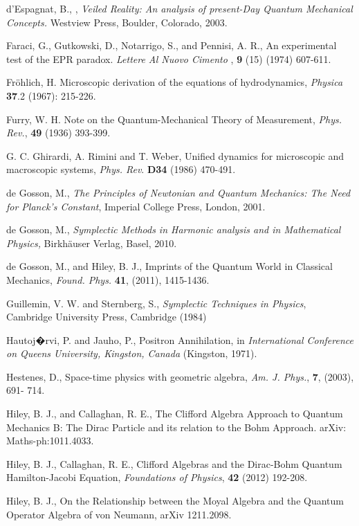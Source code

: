 \documentclass[11pt]{article}
\begin{document}
\begin{thebibliography}{99}
 d'Espagnat, B., , {\em Veiled Reality: An analysis of present-Day Quantum Mechanical Concepts.} Westview Press, Boulder, Colorado, 2003.

 Faraci, G., Gutkowski, D., Notarrigo, S., and  Pennisi, A. R., An experimental test of the EPR paradox. {\em Lettere Al Nuovo Cimento} , {\bf 9} (15) (1974) 607-611.



 Fr\"{o}hlich, H. Microscopic derivation of the equations of hydrodynamics,  {\em Physica} {\bf 37}.2 (1967): 215-226.

 Furry, W. H. Note on the Quantum-Mechanical Theory of Measurement, {\em Phys. Rev.}, {\bf 49} (1936) 393-399.

  G. C. Ghirardi, A. Rimini and T. Weber, Unified dynamics for microscopic and macroscopic systems, {\em Phys. Rev}. {\bf D34} (1986) 470-491.
 
 de Gosson, M., { \em The Principles of Newtonian and Quantum Mechanics: The Need for Planck's Constant}, Imperial College Press, London, 2001.

 de Gosson, M., {\em Symplectic Methods in Harmonic analysis and in Mathematical Physics,} Birkh\"{a}user Verlag, Basel, 2010.

  de Gosson, M., and Hiley, B. J., Imprints of the Quantum World in Classical Mechanics, {\em Found. Phys.} {\bf 41}, (2011), 1415-1436.

 Guillemin, V. W. and Sternberg, S., {\em Symplectic Techniques in Physics}, Cambridge University Press, Cambridge  (1984)

 Hautoj�rvi, P. and  Jauho, P., Positron Annihilation, in {\em International Conference on Queens University, Kingston, Canada} (Kingston, 1971).

 Hestenes, D., Space-time physics with geometric algebra,  {\em Am. J. Phys.}, {\bf 7}, (2003), 691- 714.


 Hiley, B. J., and Callaghan, R. E., The Clifford Algebra Approach to Quantum Mechanics B: The Dirac Particle and its relation to the Bohm Approach. arXiv: Maths-ph:1011.4033.

 Hiley, B. J., Callaghan, R. E., Clifford Algebras and the Dirac-Bohm Quantum Hamilton-Jacobi Equation, {\em Foundations of Physics}, {\bf 42} (2012) 192-208.

 Hiley, B. J., On the Relationship between the Moyal Algebra and the Quantum Operator Algebra of von Neumann, arXiv 1211.2098.


\end{thebibliography}
\end{document}
